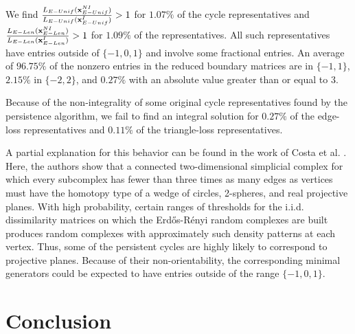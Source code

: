 We find $\frac{L_{E-Unif}(\mathbf{x}^{NI}_{E-Unif})}{L_{E-Unif}(\mathbf{x}^{I}_{E-Unif})}> 1$ for $1.07\%$ of the cycle representatives and $\frac{L_{E-Len}(\mathbf{x}^{NI}_{E-Len})}{L_{E-Len}(\mathbf{x}^{I}_{E-Len})}> 1$ for $1.09\%$ of the representatives. All such representatives have entries outside of $\{-1,0,1\}$ and involve some fractional entries. An average of $96.75\%$ of the nonzero entries in the reduced boundary matrices are in $\{-1,1\}$, $2.15\%$ in $\{-2,2\}$, and $0.27\%$ with an absolute value greater than or equal to $3$. 

Because of the non-integrality of some original cycle representatives found by the persistence algorithm, we fail to find an integral solution for $0.27\%$ of the edge-loss representatives and $0.11\%$ of the triangle-loss representatives. 

A partial explanation for this  behavior can be found in the work of Costa et al. \cite{erdos-renyi-RP2}. Here, the authors show that a connected two-dimensional simplicial complex for which every subcomplex has fewer than three times as many edges as vertices must have the homotopy type of a wedge of circles, 2-spheres, and real projective planes. With high probability, certain ranges of thresholds for the i.i.d. dissimilarity matrices on which the Erd\H{o}s-R\'enyi random complexes are built produces random complexes with approximately such density patterns at each vertex. Thus, some of the persistent cycles are highly likely to correspond to projective planes. Because of their non-orientability, the corresponding minimal generators could be expected to have entries outside of the range $\{-1, 0, 1\}.$

 \section{Conclusion}\label{discussion}

